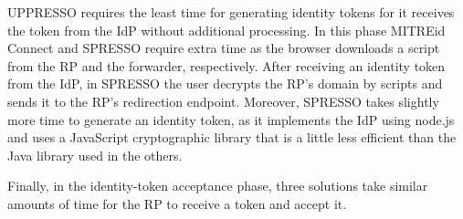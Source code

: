 UPPRESSO requires the least time for generating identity tokens for it receives the token from the IdP without additional processing.
In this phase MITREid Connect and SPRESSO require extra time as the browser downloads a script from the RP and the forwarder, respectively. %
After receiving an identity token from the IdP, in SPRESSO the user decrypts the RP's domain by scripts and sends it to the RP's redirection endpoint.
Moreover, SPRESSO takes slightly more time to generate an identity token, as it implements the IdP using node.js and uses a JavaScript cryptographic library that is a little less efficient than the Java library used in the others.

Finally, in the identity-token acceptance phase, 
three solutions take similar amounts of time for the RP to receive a token and accept it.

